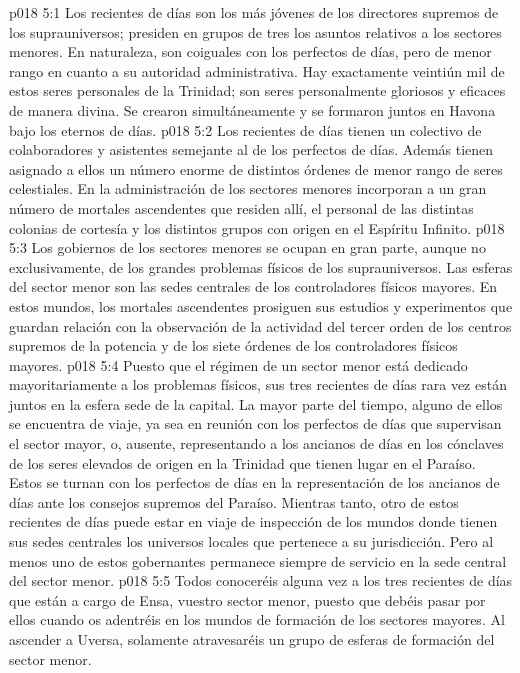 \vs p018 5:1 Los recientes de días son los más jóvenes de los directores supremos de los suprauniversos; presiden en grupos de tres los asuntos relativos a los sectores menores. En naturaleza, son coiguales con los perfectos de días, pero de menor rango en cuanto a su autoridad administrativa. Hay exactamente veintiún mil de estos seres personales de la Trinidad; son seres personalmente gloriosos y eficaces de manera divina. Se crearon simultáneamente y se formaron juntos en Havona bajo los eternos de días.
\vs p018 5:2 Los recientes de días tienen un colectivo de colaboradores y asistentes semejante al de los perfectos de días. Además tienen asignado a ellos un número enorme de distintos órdenes de menor rango de seres celestiales. En la administración de los sectores menores incorporan a un gran número de mortales ascendentes que residen allí, el personal de las distintas colonias de cortesía y los distintos grupos con origen en el Espíritu Infinito.
\vs p018 5:3 Los gobiernos de los sectores menores se ocupan en gran parte, aunque no exclusivamente, de los grandes problemas físicos de los suprauniversos. Las esferas del sector menor son las sedes centrales de los controladores físicos mayores. En estos mundos, los mortales ascendentes prosiguen sus estudios y experimentos que guardan relación con la observación de la actividad del tercer orden de los centros supremos de la potencia y de los siete órdenes de los controladores físicos mayores.
\vs p018 5:4 Puesto que el régimen de un sector menor está dedicado mayoritariamente a los problemas físicos, sus tres recientes de días rara vez están juntos en la esfera sede de la capital. La mayor parte del tiempo, alguno de ellos se encuentra de viaje, ya sea en reunión con los perfectos de días que supervisan el sector mayor, o, ausente, representando a los ancianos de días en los cónclaves de los seres elevados de origen en la Trinidad que tienen lugar en el Paraíso. Estos se turnan con los perfectos de días en la representación de los ancianos de días ante los consejos supremos del Paraíso. Mientras tanto, otro de estos recientes de días puede estar en viaje de inspección de los mundos donde tienen sus sedes centrales los universos locales que pertenece a su jurisdicción. Pero al menos uno de estos gobernantes permanece siempre de servicio en la sede central del sector menor.
\vs p018 5:5 Todos conoceréis alguna vez a los tres recientes de días que están a cargo de Ensa, vuestro sector menor, puesto que debéis pasar por ellos cuando os adentréis en los mundos de formación de los sectores mayores. Al ascender a Uversa, solamente atravesaréis un grupo de esferas de formación del sector menor.
